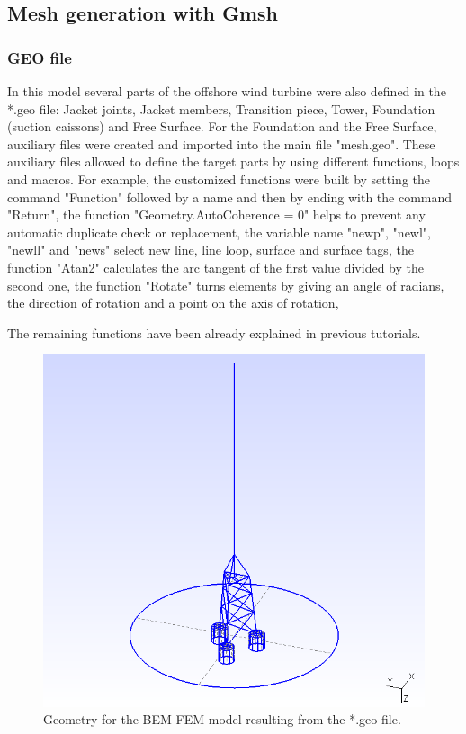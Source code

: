 \documentclass[a4]{article}
\begin{document}
\subsection{Mesh generation with Gmsh}

\subsubsection{GEO file}
In this model several parts of the offshore wind turbine were also defined in the *.geo file: Jacket joints, Jacket members, Transition piece, Tower, Foundation (suction caissons) and Free Surface. For the Foundation and the Free Surface, auxiliary files were created and imported into the main file "mesh.geo". These auxiliary files allowed to define the target parts by using different functions, loops and macros. For example, the customized functions were built by setting the command "Function" followed by a name and then by ending with the command "Return", the function "Geometry.AutoCoherence = 0" helps to prevent any automatic duplicate check or replacement, the variable name "newp", "newl", "newll" and "news" select new line, line loop, surface and surface tags, the function "Atan2" calculates the arc tangent of the first value divided by the second one, the function "Rotate" turns elements by giving an angle of radians, the direction of rotation and a point on the axis of rotation, 

The remaining functions have been already explained in previous tutorials.

\begin{figure}[tbh!]
	\centering
	\includegraphics[scale=0.6]{geo2.png}
	\caption{Geometry for the BEM-FEM model resulting from the *.geo file.}
	\label{fig:geo2}
\end{figure}
\end{document}
